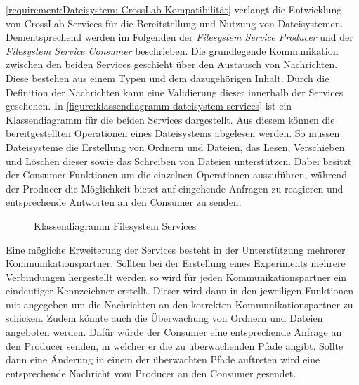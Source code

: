 \autoref{requirement:Dateisystem: CrossLab-Kompatibilität} verlangt die Entwicklung von CrossLab-Services für die Bereitstellung und Nutzung von Dateisystemen. Dementsprechend werden im Folgenden der \textit{Filesystem Service Producer} und der \textit{Filesystem Service Consumer} beschrieben. Die grundlegende Kommunikation zwischen den beiden Services geschieht über den Austausch von Nachrichten. Diese bestehen aus einem Typen und dem dazugehörigen Inhalt. Durch die Definition der Nachrichten kann eine Validierung dieser innerhalb der Services geschehen. In \autoref{figure:klassendiagramm-dateisystem-services} ist ein Klassendiagramm für die beiden Services dargestellt. Aus diesem können die bereitgestellten Operationen eines Dateisystems abgelesen werden. So müssen Dateisysteme die Erstellung von Ordnern und Dateien, das Lesen, Verschieben und Löschen dieser sowie das Schreiben von Dateien unterstützen. Dabei besitzt der Consumer Funktionen um die einzelnen Operationen auszuführen, während der Producer die Möglichkeit bietet auf eingehende Anfragen zu reagieren und entsprechende Antworten an den Consumer zu senden.

\begin{figure}[tbp]
    \centering
    \caption{Klassendiagramm Filesystem Services}
    \label{figure:klassendiagramm-dateisystem-services}
\end{figure}

Eine mögliche Erweiterung der Services besteht in der Unterstützung mehrerer Kommunikationspartner. Sollten bei der Erstellung eines Experiments mehrere Verbindungen hergestellt werden so wird für jeden Kommunikationspartner ein eindeutiger Kennzeichner erstellt. Dieser wird dann in den jeweiligen Funktionen mit angegeben um die Nachrichten an den korrekten Kommunikationspartner zu schicken. Zudem könnte auch die Überwachung von Ordnern und Dateien angeboten werden. Dafür würde der Consumer eine entsprechende Anfrage an den Producer senden, in welcher er die zu überwachenden Pfade angibt. Sollte dann eine Änderung in einem der überwachten Pfade auftreten wird eine entsprechende Nachricht vom Producer an den Consumer gesendet.

